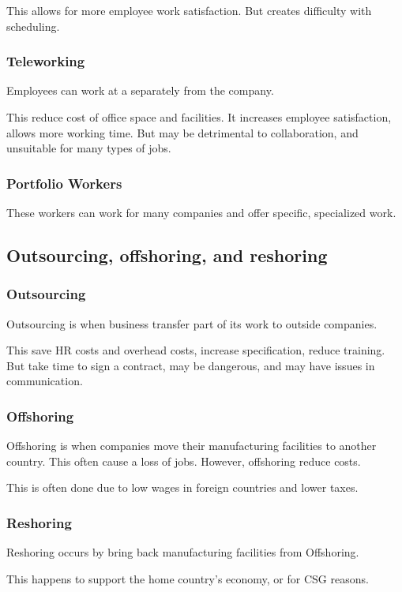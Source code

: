 \documentclass{standalone}
\begin{document}
This allows for more employee work satisfaction.
But creates difficulty with scheduling.

\subsubsection{Teleworking}
Employees can work at a separately from the company.

This reduce cost of office space and facilities.
It increases employee satisfaction, allows more working time.
But may be detrimental to collaboration, and unsuitable for many types of jobs.

\subsubsection{Portfolio Workers}
These workers can work for many companies and offer specific, specialized work.

\subsection{Outsourcing, offshoring, and reshoring}

\subsubsection{Outsourcing}
Outsourcing is when business transfer part of its work to outside companies.

This save HR costs and overhead costs, increase specification, reduce training.
But take time to sign a contract, may be dangerous, and may have issues in communication.

\subsubsection{Offshoring}
Offshoring is when companies move their manufacturing facilities to another country.
This often cause a loss of jobs.  
However, offshoring reduce costs.

This is often done due to low wages in foreign countries and lower taxes.

\subsubsection{Reshoring}
Reshoring occurs by bring back manufacturing facilities from Offshoring.

This happens to support the home country's economy, or for CSG reasons.
\end{document}
